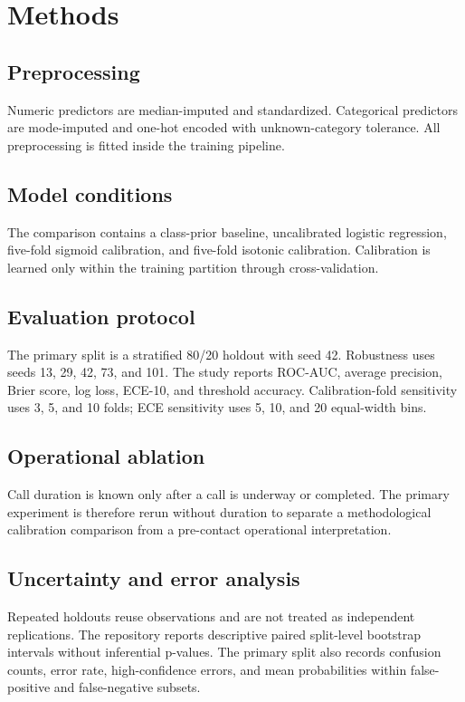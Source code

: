\documentclass[11pt]{article}
\begin{document}
\section{Methods}
\subsection{Preprocessing}
Numeric predictors are median-imputed and standardized. Categorical predictors are mode-imputed and one-hot encoded with unknown-category tolerance. All preprocessing is fitted inside the training pipeline.

\subsection{Model conditions}
The comparison contains a class-prior baseline, uncalibrated logistic regression, five-fold sigmoid calibration, and five-fold isotonic calibration. Calibration is learned only within the training partition through cross-validation.

\subsection{Evaluation protocol}
The primary split is a stratified 80/20 holdout with seed 42. Robustness uses seeds 13, 29, 42, 73, and 101. The study reports ROC-AUC, average precision, Brier score, log loss, ECE-10, and threshold accuracy. Calibration-fold sensitivity uses 3, 5, and 10 folds; ECE sensitivity uses 5, 10, and 20 equal-width bins.

\subsection{Operational ablation}
Call duration is known only after a call is underway or completed. The primary experiment is therefore rerun without duration to separate a methodological calibration comparison from a pre-contact operational interpretation.

\subsection{Uncertainty and error analysis}
Repeated holdouts reuse observations and are not treated as independent replications. The repository reports descriptive paired split-level bootstrap intervals without inferential p-values. The primary split also records confusion counts, error rate, high-confidence errors, and mean probabilities within false-positive and false-negative subsets.
\end{document}
